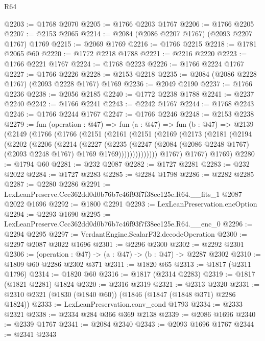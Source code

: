 \begin{lexlean}{R64}
\begin{coremodule}
@2203 := @1768 @2070
@2205 := @1766 @2203 @1767
@2206 := @1766 @2205
@2207 := @2153 @2065
@2214 := @2084 (@2086 @2207 @1767) (@2093 @2207 @1767) @1769
@2215 := @2069 @1769
@2216 := @1766 @2215
@2218 := @1781 @2065 @60
@2220 := @1772 @2218 @1788
@2221 := @2216 @2220
@2223 := @1766 @2221 @1767
@2224 := @1768 @2223
@2226 := @1766 @2224 @1767
@2227 := @1766 @2226
@2228 := @2153 @2218
@2235 := @2084 (@2086 @2228 @1767) (@2093 @2228 @1767) @1769
@2236 := @2049 @2190
@2237 := @1766 @2236
@2238 := @2056 @2185
@2240 := @1772 @2238 @1788
@2241 := @2237 @2240
@2242 := @1766 @2241
@2243 := @2242 @1767
@2244 := @1768 @2243
@2246 := @1766 @2244 @1767
@2247 := @1766 @2246
@2248 := @2153 @2238
@2279 := fun (operation : @47) =>
  fun (a : @47) =>
  fun (b : @47) =>
  @2139
    (@2149
      (@1766
        (@1766
          (@2151
            (@2161
              (@2151
                (@2169
                  (@2173
                    (@2181
                      (@2194
                        (@2202
                          (@2206
                            (@2214
                              (@2227
                                (@2235
                                  (@2247
                                    (@2084
                                      (@2086 @2248 @1767)
                                      (@2093 @2248 @1767)
                                      @1769
                                      @1769))))))))))))))
          @1767)
        @1767)
      @1769)
@2280 := @1794 @60
@2281 := @232 @2087
@2282 := @1727 @2281
@2283 := @232 @2022
@2284 := @1727 @2283
@2285 := @2284 @1798
@2286 := @2282 @2285
@2287 := @2280 @2286
@2291 := LexLeanPreserve.Ccc362dd0d0b76b7c46f93f7f38ec125e.R64.__fits_1 @2087 @2022 @1696
@2292 := @1800 @2291
@2293 := LexLeanPreservation.encOption
@2294 := @2293 @1690
@2295 := LexLeanPreserve.Ccc362dd0d0b76b7c46f93f7f38ec125e.R64.__enc_0
@2296 := @2294 @2295
@2297 := VerdantEngine.ScalarF32.decodeOperation
@2300 := @2297 @2087 @2022 @1696
@2301 := @2296 @2300
@2302 := @2292 @2301
@2306 := (operation : @47) -> (a : @47) -> (b : @47) -> @2287 @2302
@2310 := @1809 @60 @2286 @2302 @371
@2311 := @1820 @65
@2313 := @1817 (@2311 @1796)
@2314 := @1820 @60
@2316 := @1817 (@2314 @2283)
@2319 := @1817 (@1821 @2281) @1824
@2320 := @2316 @2319
@2321 := @2313 @2320
@2331 := @2310 @2321 (@1830 (@1840 @60)) (@1846 (@1847 (@1848 @371) @2286 @1824))
@2333 := LexLeanPreservation.conv_cond @1793
@2334 := @2333 @2321
@2338 := @2334 @284 @366 @369 @2138
@2339 := @2086 @1696
@2340 := @2339 @1767
@2341 := @2084 @2340
@2343 := @2093 @1696 @1767
@2344 := @2341 @2343

\end{coremodule}
\end{lexlean}
